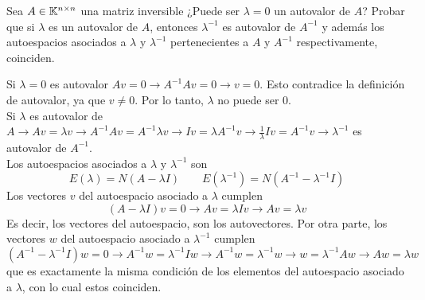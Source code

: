 \item Sea $A\in\mathbb{K}^{n\times n}$ una matriz inversible ¿Puede ser $\lambda=0$ un autovalor de $A$? Probar que si $\lambda$ es un autovalor de $A$, entonces $\lambda^{-1}$ es autovalor de $A^{-1}$ y además los autoespacios asociados a $\lambda$ y $\lambda^{-1}$ pertenecientes a $A$ y $A^{-1}$ respectivamente, coinciden.
    \begin{mdframed}[style=s]
        Si $\lambda=0$ es autovalor $Av=0\to A^{-1}Av=0\to v=0$. Esto contradice la definición de autovalor, ya que $v\neq 0$. Por lo tanto, $\lambda$ no puede ser $0$.\\
        Si $\lambda$ es autovalor de $A\to Av=\lambda v\to A^{-1}Av=A^{-1}\lambda v\to Iv=\lambda A^{-1}v\to \frac{1}{\lambda}Iv=A^{-1}v\to \lambda^{-1}$ es autovalor de $A^{-1}$.\\
        Los autoespacios asociados a $\lambda$ y $\lambda^{-1}$ son\[E(\lambda)=N(A-\lambda I)\qquad E(\lambda^{-1})=N(A^{-1}-\lambda^{-1}I)\]
        Los vectores $v$ del autoespacio asociado a $\lambda$ cumplen\[(A-\lambda I)v=0\to Av=\lambda Iv\to Av=\lambda v\]
        Es decir, los vectores del autoespacio, son los autovectores. Por otra parte, los vectores $w$ del autoespacio asociado a $\lambda^{-1}$ cumplen\[(A^{-1}-\lambda^{-1} I)w=0\to A^{-1}w=\lambda^{-1} Iw\to A^{-1}w=\lambda^{-1} w\to w=\lambda^{-1}Aw\to Aw=\lambda w\]
        que es exactamente la misma condición de los elementos del autoespacio asociado a $\lambda$, con lo cual estos coinciden.
    \end{mdframed}